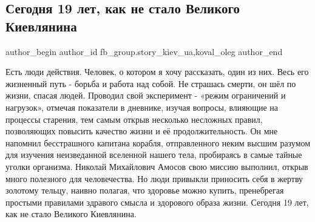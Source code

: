  
 
 
 
 
 
\subsection{Сегодня 19 лет, как не стало Великого Киевлянина}
\label{sec:12_12_2021.fb.fb_group.story_kiev_ua.1.amosov}
 
\ifcmt
 author_begin
   author_id fb_group.story_kiev_ua,koval_oleg
 author_end
\fi


\begingroup
\large
Есть люди действия. Человек, о котором я хочу рассказать, один из них. Весь его
жизненный путь - борьба и работа над собой. Не страшась смерти, он шёл по
жизни, спасая людей. Проводил свой эксперимент - «режим ограничений и
нагрузок», отмечая показатели в дневнике, изучая вопросы, влияющие на процессы
старения, тем самым открыв несколько несложных правил, позволяющих повысить
качество жизни и её продолжительность. Он мне напомнил бесстрашного капитана
корабля, отправленного неким высшим разумом для изучения неизведанной вселенной
нашего тела, пробираясь в самые тайные уголки организма. Николай Михайлович
Амосов свою миссию выполнил, открыв много полезного для человечества. Но люди
привыкли приносить себя в жертву золотому тельцу, наивно полагая, что здоровье
можно купить, пренебрегая простыми правилами здравого смысла и здорового образа
жизни. Сегодня 19 лет, как не стало Великого Киевлянина.
\endgroup

